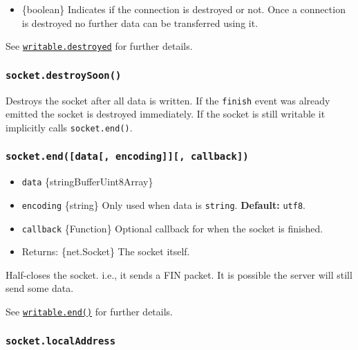 \begin{itemize}
\tightlist
\item
  \{boolean\} Indicates if the connection is destroyed or not. Once a
  connection is destroyed no further data can be transferred using it.
\end{itemize}

See \href{stream.md\#writabledestroyed}{\texttt{writable.destroyed}} for
further details.

\subsubsection{\texorpdfstring{\texttt{socket.destroySoon()}}{socket.destroySoon()}}\label{socket.destroysoon}

Destroys the socket after all data is written. If the
\texttt{\textquotesingle{}finish\textquotesingle{}} event was already
emitted the socket is destroyed immediately. If the socket is still
writable it implicitly calls \texttt{socket.end()}.

\subsubsection{\texorpdfstring{\texttt{socket.end({[}data{[},\ encoding{]}{]}{[},\ callback{]})}}{socket.end({[}data{[}, encoding{]}{]}{[}, callback{]})}}\label{socket.enddata-encoding-callback}

\begin{itemize}
\tightlist
\item
  \texttt{data} \{string\textbar Buffer\textbar Uint8Array\}
\item
  \texttt{encoding} \{string\} Only used when data is \texttt{string}.
  \textbf{Default:} \texttt{\textquotesingle{}utf8\textquotesingle{}}.
\item
  \texttt{callback} \{Function\} Optional callback for when the socket
  is finished.
\item
  Returns: \{net.Socket\} The socket itself.
\end{itemize}

Half-closes the socket. i.e., it sends a FIN packet. It is possible the
server will still send some data.

See
\href{stream.md\#writableendchunk-encoding-callback}{\texttt{writable.end()}}
for further details.

\subsubsection{\texorpdfstring{\texttt{socket.localAddress}}{socket.localAddress}}\label{socket.localaddress}

